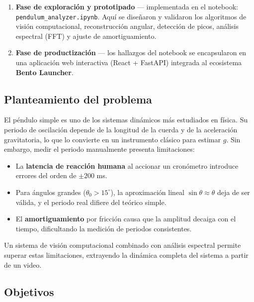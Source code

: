 \documentclass[12pt,a4paper]{article}
\begin{document}
\begin{enumerate}[label=\textbf{\arabic*.}]
    \item \textbf{Fase de exploración y prototipado} --- implementada en el notebook: \\ \texttt{pendulum\_analyzer.ipynb}. Aquí se diseñaron y validaron los algoritmos de visión computacional, reconstrucción angular, detección de picos, análisis espectral (FFT) y ajuste de amortiguamiento.
    \item \textbf{Fase de productización} — los hallazgos del notebook se encapsularon en una aplicación web interactiva (React + FastAPI) integrada al ecosistema \textbf{Bento Launcher}.
\end{enumerate}

\subsection{Planteamiento del problema}

El péndulo simple es uno de los sistemas dinámicos más estudiados en física. Su periodo de oscilación depende de la longitud de la cuerda y de la aceleración gravitatoria, lo que lo convierte en un instrumento clásico para estimar $g$. Sin embargo, medir el periodo manualmente presenta limitaciones:

\begin{itemize}
    \item La \textbf{latencia de reacción humana} al accionar un cronómetro introduce errores del orden de $\pm 200$ ms.
    \item Para ángulos grandes ($\theta_0 > 15^{\circ}$), la aproximación lineal $\sin\theta \approx \theta$ deja de ser válida, y el periodo real difiere del teórico simple.
    \item El \textbf{amortiguamiento} por fricción causa que la amplitud decaiga con el tiempo, dificultando la medición de periodos consistentes.
\end{itemize}

Un sistema de visión computacional combinado con análisis espectral permite superar estas limitaciones, extrayendo la dinámica completa del sistema a partir de un video.

\subsection{Objetivos}
\end{document}
